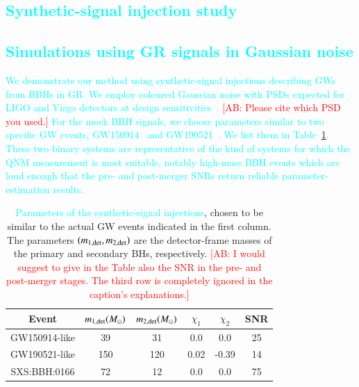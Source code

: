 \documentclass[twocolumn,prd,aps,superscriptaddress,preprintnumbers,tightenlines,showpacs,nofootinbib,eqsecnum,amsfonts,amsmath]{revtex4-1}
\newcommand{\ab}[1]{\textcolor{cyan}{#1}}
\newcommand{\comment}[1]{\textcolor{red}{[#1]}}
\newcommand{\Mo}{M_{\odot}}
\begin{document}
\ab{\section{Synthetic-signal injection study}}
\label{sec:results}

\subsection{\ab{Simulations using GR signals in Gaussian noise}} \label{ssec:gr_signal}

\ab{We demonstrate our method using synthetic-signal injections describing GWs 
from BBHs in GR. We employ coloured Gaussian noise with PSDs expected for LIGO and 
Virgo detectors at design sensitivities~\cite{}. \comment{AB: Please cite which PSD you used.} 
For the mock BBH signals, we choose parameters similar to two specific GW events, GW150914~\cite{} and 
GW190521~\cite{}. We list them in Table~\ref{tab:injection_values}. 
These two binary systems are representative of the kind of systems for which 
the QNM measurement is most suitable, notably high-mass BBH events which are loud enough that the  
pre- and post-merger SNRs return reliable parameter-estimation results.}

\begin{table}[h!]
\begin{center}
\begin{tabular}{ |c|c|c|c|c|c| }
 \hline
 Event & $m_{\rm 1,det} (\Mo)$ &  $m_{\rm 2,det} (\Mo)$ & $\chi_{1}$ & $\chi_{2}$ & SNR \\ 
 \hline
 GW150914-like & 39 & 31 & 0.0 & 0.0 & 25 \\
 GW190521-like & 150 & 120 & 0.02 & -0.39 & 14 \\ 
 SXS:BBH:0166 & 72 & 12  & 0.0 & 0.0 & 75 \\
 \hline
\end{tabular}
\caption{\ab{Parameters of the synthetic-signal injections}, chosen to be similar to the actual GW events indicated in the first column. The parameters 
$(m_{\rm 1,det},m_{\rm 2,det})$ are the detector-frame masses of the primary and secondary BHs, respectively. \comment{AB: I would suggest to give in the Table also the SNR in the pre- and post-merger stages. The third row is completely ignored in the caption's explanations.}}
\label{tab:injection_values}
\end{center}
\end{table}
\end{document}
